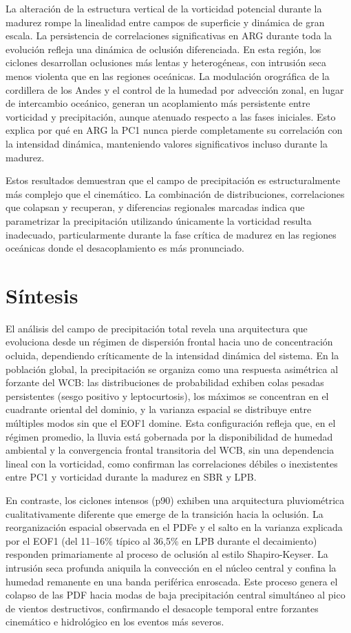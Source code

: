 La alteración de la estructura vertical de la vorticidad potencial durante la madurez rompe la linealidad entre campos de superficie y dinámica de gran escala. 
La persistencia de correlaciones significativas en ARG durante toda la evolución refleja una dinámica de oclusión diferenciada. 
En esta región, los ciclones desarrollan oclusiones más lentas y heterogéneas, con intrusión seca menos violenta que en las regiones oceánicas. 
La modulación orográfica de la cordillera de los Andes y el control de la humedad por advección zonal, en lugar de intercambio oceánico, generan un acoplamiento más persistente entre vorticidad y precipitación, aunque atenuado respecto a las fases iniciales. 
Esto explica por qué en ARG la PC1 nunca pierde completamente su correlación con la intensidad dinámica, manteniendo valores significativos incluso durante la madurez.

Estos resultados demuestran que el campo de precipitación es estructuralmente más complejo que el cinemático. La combinación de distribuciones, correlaciones que colapsan y recuperan, y diferencias regionales marcadas indica que parametrizar la precipitación utilizando únicamente la vorticidad resulta inadecuado, particularmente durante la fase crítica de madurez en las regiones oceánicas donde el desacoplamiento es más pronunciado.

\section{Síntesis}\label{sec:sintesis_tp}

El análisis del campo de precipitación total revela una arquitectura que evoluciona desde un régimen de dispersión frontal hacia uno de concentración ocluida, dependiendo críticamente de la intensidad dinámica del sistema. 
En la población global, la precipitación se organiza como una respuesta asimétrica al forzante del WCB: las distribuciones de probabilidad exhiben colas pesadas persistentes (sesgo positivo y leptocurtosis), los máximos se concentran en el cuadrante oriental del dominio, y la varianza espacial se distribuye entre múltiples modos sin que el EOF1 domine. 
Esta configuración refleja que, en el régimen promedio, la lluvia está gobernada por la disponibilidad de humedad ambiental y la convergencia frontal transitoria del WCB, sin una dependencia lineal con la vorticidad, como confirman las correlaciones débiles o inexistentes entre PC1 y vorticidad durante la madurez en SBR y LPB.

En contraste, los ciclones intensos (p90) exhiben una arquitectura pluviométrica cualitativamente diferente que emerge de la transición hacia la oclusión. La reorganización espacial observada en el PDFe y el salto en la varianza explicada por el EOF1 (del 11--16\% típico al 36,5\% en LPB durante el decaimiento) responden primariamente al proceso de oclusión al estilo Shapiro-Keyser. La intrusión seca profunda aniquila la convección en el núcleo central y confina la humedad remanente en una banda periférica enroscada.
Este proceso genera el colapso de las PDF hacia modas de baja precipitación central simultáneo al pico de vientos destructivos, confirmando el desacople temporal entre forzantes cinemático e hidrológico en los eventos más severos.


